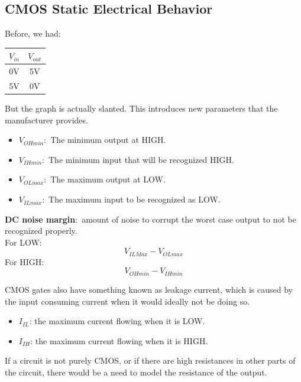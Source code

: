 \documentclass[nobib]{tufte-handout}
\newcommand{\defn}[2]{\noindent\textbf{#1}:\ #2}
\begin{document}
    \subsection{CMOS Static Electrical Behavior}
    Before, we had:
    \begin{table}
        \centering
        \begin{tabular}{c|c}
            $V_{in}$ & $V_{out}$ \\
            \hline
            0V       & 5V        \\
            5V       & 0V
        \end{tabular}
    \end{table}
    But the graph is actually slanted. This introduces new parameters that the manufacturer provides.\\
    \begin{itemize}
        \item \defn{$V_{OHmin}$}{The minimum output at HIGH.}
        \item \defn{$V_{IHmin}$}{The minimum input that will be recognized HIGH.}
        \item \defn{$V_{OLmax}$}{The maximum output at LOW.}
        \item \defn{$V_{ILmax}$}{The maximum input to be recognized as LOW.}
    \end{itemize}
    \defn{DC noise margin}{amount of noise to corrupt the worst case output to not be recognized properly.\\
        \quad For LOW:
        \begin{equation*}
            V_{ILMax} - V_{OLmax}
        \end{equation*}
        \quad For HIGH:
        \begin{equation*}
            V_{OHmin} - V_{IHmin}
        \end{equation*}
    }
    CMOS gates also have something known as leakage current, which is caused by the input consuming current when it would ideally not be doing so.\\
    \begin{itemize}
        \item $I_{IL}$: the maximum current flowing when it is LOW.
        \item $I_{IH}$: the maximum current flowing when it is HIGH.
    \end{itemize}
    If a circuit is not purely CMOS, or if there are high resistances in other parts of the circuit, there would be a need to model the resistance of the output.
\end{document}
